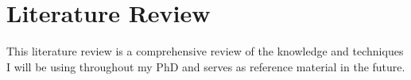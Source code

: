 \section{\label{sec:LitRev}Literature Review}

This literature review is a comprehensive review of the knowledge and techniques I will be using throughout my PhD and serves as reference material in the future.

